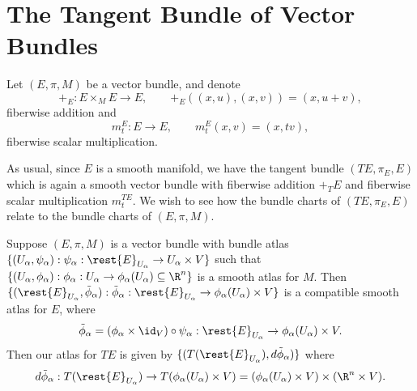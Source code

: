 



\section{The Tangent Bundle of Vector Bundles}


Let $(E,\pi,M)$ be a vector bundle, and denote 
$$+_E:E\times_ME\to E,\qquad +_E((x,u),(x,v))=(x,u+v),$$
fiberwise addition and
$$m_t^E:E\to E,\qquad m_t^E(x,v)=(x,tv),$$
fiberwise scalar multiplication.

As usual, since $E$ is a smooth manifold, we have the tangent bundle $(TE,\pi_E,E)$ which is again a smooth vector bundle with fiberwise addition $+_TE$ and fiberwise scalar multiplication $m_t^{TE}$.  We wish to see how the bundle charts of $(TE,\pi_E,E)$ relate to the bundle charts of $(E,\pi,M)$.

Suppose $(E,\pi,M)$ is a vector bundle with bundle atlas $\{(U_\alpha,\psi_\alpha):\psi_\alpha:\rest{E}_{U_\alpha}\to U_\alpha\times V\}$ such that $\{(U_\alpha,\phi_\alpha):\phi_\alpha:U_\alpha\to\phi_\alpha(U_\alpha)\subseteq\R^n\}$ is a smooth atlas for $M$.  Then $\{(\rest{E}_{U_\alpha},\tilde{\phi}_\alpha):\tilde{\phi}_\alpha:\rest{E}_{U_\alpha}\to\phi_\alpha(U_\alpha)\times V\}$ is a compatible smooth atlas for $E$, where
$$\tilde{\phi}_\alpha=(\phi_\alpha\times\id_V)\circ\psi_\alpha:\rest{E}_{U_\alpha}\to\phi_\alpha(U_\alpha)\times V.$$
Then our atlas for $TE$ is given by $\{(T(\rest{E}_{U_\alpha}),d\tilde{\phi}_\alpha)\}$
where
$$d\tilde{\phi}_\alpha:T(\rest{E}_{U_\alpha})\to T(\phi_\alpha(U_\alpha)\times V)=(\phi_\alpha(U_\alpha)\times V)\times(\R^n\times V).$$


